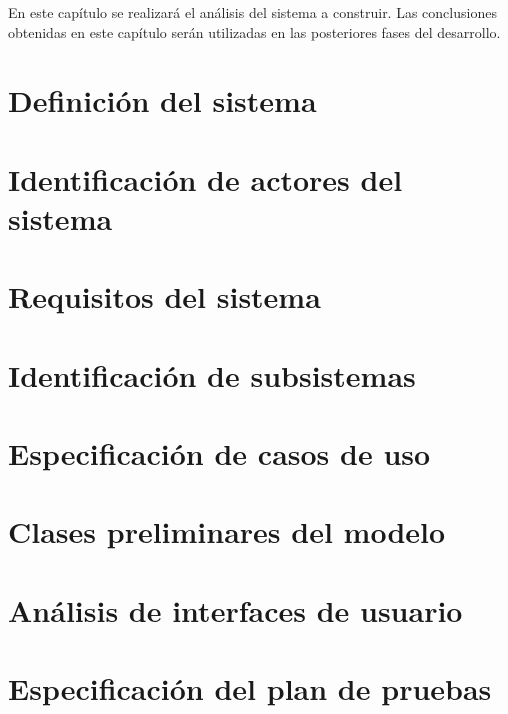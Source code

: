 En este capítulo se realizará el análisis del sistema a construir.  Las conclusiones obtenidas en este capítulo serán utilizadas en las posteriores fases del desarrollo.

\section{Definición del sistema}
\label{definicion_sistema}



\section{Identificación de actores del sistema}
\label{identificacion_actores}



\section{Requisitos del sistema}
\label{requisitos_sistema}



\section{Identificación de subsistemas}
\label{identificacion_subsistemas}



\section{Especificación de casos de uso}
\label{especificacion_casos_uso}



\section{Clases preliminares del modelo}
\label{clases_preliminares_modelo}



\section{Análisis de interfaces de usuario}
\label{analisis_interfaces_usuario}



\section{Especificación del plan de pruebas}
\label{especificacion_plan_pruebas}
